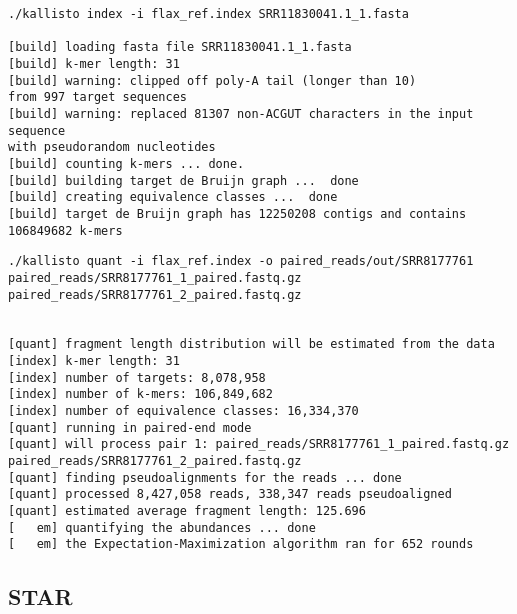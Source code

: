 \begin{verbatim}
./kallisto index -i flax_ref.index SRR11830041.1_1.fasta

[build] loading fasta file SRR11830041.1_1.fasta
[build] k-mer length: 31
[build] warning: clipped off poly-A tail (longer than 10)
from 997 target sequences
[build] warning: replaced 81307 non-ACGUT characters in the input sequence
with pseudorandom nucleotides
[build] counting k-mers ... done.
[build] building target de Bruijn graph ...  done
[build] creating equivalence classes ...  done
[build] target de Bruijn graph has 12250208 contigs and contains 106849682 k-mers

\end{verbatim}

\begin{verbatim}
./kallisto quant -i flax_ref.index -o paired_reads/out/SRR8177761 paired_reads/SRR8177761_1_paired.fastq.gz  paired_reads/SRR8177761_2_paired.fastq.gz


[quant] fragment length distribution will be estimated from the data
[index] k-mer length: 31
[index] number of targets: 8,078,958
[index] number of k-mers: 106,849,682
[index] number of equivalence classes: 16,334,370
[quant] running in paired-end mode
[quant] will process pair 1: paired_reads/SRR8177761_1_paired.fastq.gz
paired_reads/SRR8177761_2_paired.fastq.gz
[quant] finding pseudoalignments for the reads ... done
[quant] processed 8,427,058 reads, 338,347 reads pseudoaligned
[quant] estimated average fragment length: 125.696
[   em] quantifying the abundances ... done
[   em] the Expectation-Maximization algorithm ran for 652 rounds
\end{verbatim}

\subsection{STAR}


